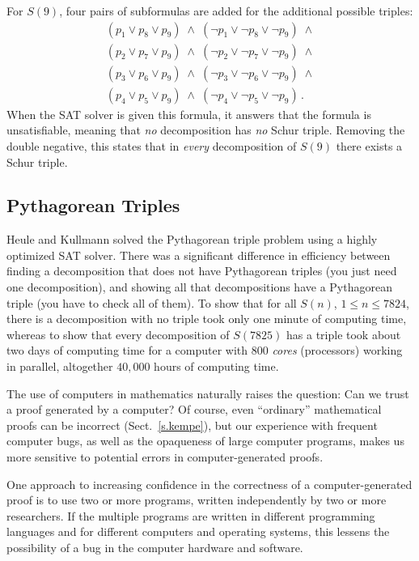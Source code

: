 \newpage

For $S(9)$, four pairs of subformulas are added for the additional possible triples:
\[
\begin{array}{l}
(p_1 \vee p_8 \vee p_9) \;\wedge\; (\neg p_1 \vee \neg p_8 \vee \neg p_9) \;\wedge \\
(p_2 \vee p_7 \vee p_9) \;\wedge\; (\neg p_2 \vee \neg p_7 \vee \neg p_9) \;\wedge \\
(p_3 \vee p_6 \vee p_9) \;\wedge\; (\neg p_3 \vee \neg p_6 \vee \neg p_9) \;\wedge \\
(p_4 \vee p_5 \vee p_9) \;\wedge\; (\neg p_4 \vee \neg p_5 \vee \neg p_9)\,.
\end{array}
\]
When the SAT solver is given this formula, it answers that the formula is unsatisfiable, meaning that \emph{no} decomposition has \emph{no} Schur triple. Removing the double negative, this states that in \emph{every} decomposition of $S(9)$ there exists a Schur triple.

\subsection{Pythagorean Triples}

Heule and Kullmann solved the Pythagorean triple problem using a highly optimized SAT solver. There was a significant difference in efficiency between finding a decomposition that does not have Pythagorean triples (you just need one decomposition), and showing all that decompositions have a Pythagorean triple (you have to check all of them). To show that for all $S(n)$, $1\leq n\leq 7824$, there is a decomposition with no triple took only one minute of computing time, whereas to show that every decomposition of $S(7825)$ has a triple took about two days of computing time for a computer with $800$ \emph{cores} (processors) working in parallel, altogether $40,000$ hours of computing time.

The use of computers in mathematics naturally raises the question: Can we trust a proof generated by a computer? Of course, even ``ordinary'' mathematical proofs can be incorrect (Sect.~\ref{s.kempe}), but our experience with frequent computer bugs, as well as the opaqueness of large computer programs, makes us more sensitive to potential errors in computer-generated proofs.

One approach to increasing confidence in the correctness of a computer-generated proof is to use two or more programs, written independently by two or more researchers. If the multiple programs are written in different programming languages and for different computers and operating systems, this lessens the possibility of a bug in the computer hardware and software.

